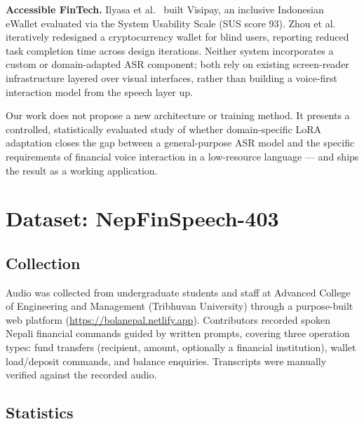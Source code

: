 \documentclass[11pt,a4paper]{article}
\begin{document}
\textbf{Accessible FinTech.} Ilyasa et al.~\cite{ilyasa2023} built Visipay,
an inclusive Indonesian eWallet evaluated via the System Usability Scale
(SUS score 93). Zhou et al.~\cite{zhou2023} iteratively redesigned a
cryptocurrency wallet for blind users, reporting reduced task completion
time across design iterations. Neither system incorporates a custom or
domain-adapted ASR component; both rely on existing screen-reader
infrastructure layered over visual interfaces, rather than building a
voice-first interaction model from the speech layer up.

Our work does not propose a new architecture or training method. It
presents a controlled, statistically evaluated study of whether
domain-specific LoRA adaptation closes the gap between a general-purpose
ASR model and the specific requirements of financial voice interaction in a
low-resource language --- and ships the result as a working application.

\section{Dataset: NepFinSpeech-403}

\subsection{Collection}

Audio was collected from undergraduate students and staff at Advanced
College of Engineering and Management (Tribhuvan University) through a
purpose-built web platform
(\url{https://bolanepal.netlify.app}). Contributors
recorded spoken Nepali financial commands guided by written prompts,
covering three operation types: fund transfers (recipient, amount,
optionally a financial institution), wallet load/deposit commands, and
balance enquiries. Transcripts were manually verified against the recorded
audio.

\subsection{Statistics}
\end{document}
